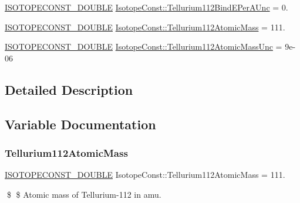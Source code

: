 \begin{DoxyCompactItemize}
\mbox{\hyperlink{group___isotope_const-_macros_ga8f45a7272ce02c0b4c65c44636ed719a}{I\+S\+O\+T\+O\+P\+E\+C\+O\+N\+S\+T\+\_\+\+D\+O\+U\+B\+LE}} \mbox{\hyperlink{group___isotope_const-_tellurium-_te112_ga1236a830a540a95d600f265eba747b31}{Isotope\+Const\+::\+Tellurium112\+Bind\+E\+Per\+A\+Unc}} = 0.
\item 
\mbox{\hyperlink{group___isotope_const-_macros_ga8f45a7272ce02c0b4c65c44636ed719a}{I\+S\+O\+T\+O\+P\+E\+C\+O\+N\+S\+T\+\_\+\+D\+O\+U\+B\+LE}} \mbox{\hyperlink{group___isotope_const-_tellurium-_te112_gaadfa550fce9688242cb1f5a130e6e9de}{Isotope\+Const\+::\+Tellurium112\+Atomic\+Mass}} = 111.
\item 
\mbox{\hyperlink{group___isotope_const-_macros_ga8f45a7272ce02c0b4c65c44636ed719a}{I\+S\+O\+T\+O\+P\+E\+C\+O\+N\+S\+T\+\_\+\+D\+O\+U\+B\+LE}} \mbox{\hyperlink{group___isotope_const-_tellurium-_te112_ga40a6877022f4b9316097373bf212a69b}{Isotope\+Const\+::\+Tellurium112\+Atomic\+Mass\+Unc}} = 9e-\/06
\end{DoxyCompactItemize}


\subsection{Detailed Description}


\subsection{Variable Documentation}
\mbox{\label{group___isotope_const-_tellurium-_te112_gaadfa550fce9688242cb1f5a130e6e9de}} 
\subsubsection{\texorpdfstring{Tellurium112\+Atomic\+Mass}{Tellurium112AtomicMass}}
{\footnotesize\ttfamily \mbox{\hyperlink{group___isotope_const-_macros_ga8f45a7272ce02c0b4c65c44636ed719a}{I\+S\+O\+T\+O\+P\+E\+C\+O\+N\+S\+T\+\_\+\+D\+O\+U\+B\+LE}} Isotope\+Const\+::\+Tellurium112\+Atomic\+Mass = 111.}

\$ \$ Atomic mass of Tellurium-\/112 in amu. \mbox{\label{group___isotope_const-_tellurium-_te112_ga40a6877022f4b9316097373bf212a69b}} 
